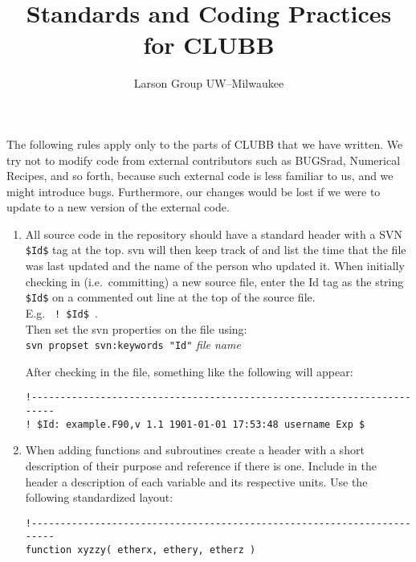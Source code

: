 \documentclass[letterpaper,12pt]{article}
\begin{document}
\title{\textbf{Standards and Coding Practices for CLUBB}}
\author{Larson Group UW--Milwaukee}

\maketitle

\sloppy

The following rules apply only to the parts of CLUBB that we have written.  We try not to modify
code from external contributors such as BUGSrad, 
Numerical Recipes, and so forth, because such external code is
less familiar to us, and we might introduce bugs.  Furthermore, our changes would be lost if
we were to update to a new version of the external code.
\newline


\begin{enumerate}
\item All source code in the repository should 
have a standard header with a SVN \texttt{\$Id\$} tag at the top.  svn will then
keep track of and list the time that the file was last updated and the name of
the person who updated it.  
\newline
When initially checking in (i.e.~committing) a new source file, enter the Id tag as 
the string \texttt{\$Id\$} on a commented out line at the top of the 
source file. \\
E.g. \verb| ! $Id$ |. \\
Then set the svn properties on the file using: \\
\verb|svn propset svn:keywords "Id"| \textsl{file name}

\bigskip

After checking in the file, something like the following will appear:
\begin{verbatim}
!-----------------------------------------------------------------------
! $Id: example.F90,v 1.1 1901-01-01 17:53:48 username Exp $

\end{verbatim}

\item When adding functions and subroutines create a header with a short 
description of their purpose and reference if there is one.  Include 
in the header a description of 
each variable and its respective units.  Use the following standardized
layout: 

\begin{verbatim}
!-----------------------------------------------------------------------
function xyzzy( etherx, ethery, etherz )


\end{verbatim}
\end{enumerate}
\end{document}

